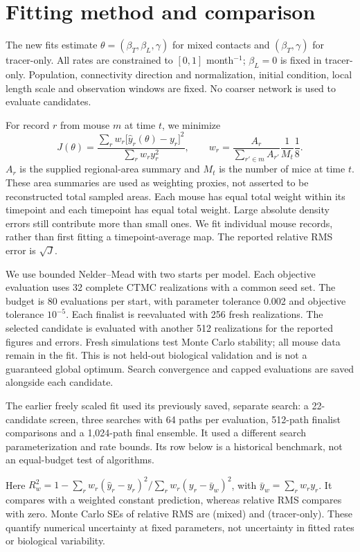 \documentclass[10pt]{article}
\begin{document}
\newpage
\section{Fitting method and comparison}
The new fits estimate $\theta=(\beta_T,\beta_L,\gamma)$ for mixed contacts and $(\beta_T,\gamma)$ for tracer-only. All rates are constrained to $[0,1]$ month$^{-1}$; $\beta_L=0$ is fixed in tracer-only. Population, connectivity direction and normalization, initial condition, local length scale and observation windows are fixed. No coarser network is used to evaluate candidates.

For record $r$ from mouse $m$ at time $t$, we minimize
\begin{equation}
 J(\theta)=\frac{\sum_r w_r\big[\widehat y_r(\theta)-y_r\big]^2}
 {\sum_r w_r y_r^2},\qquad
 w_r=\frac{A_r}{\sum_{r'\in m} A_{r'}}\frac{1}{M_t}\frac{1}{8}.\label{eq:loss}
\end{equation}
$A_r$ is the supplied regional-area summary and $M_t$ is the number of mice at time $t$. These area summaries are used as weighting proxies, not asserted to be reconstructed total sampled areas. Each mouse has equal total weight within its timepoint and each timepoint has equal total weight. Large absolute density errors still contribute more than small ones. We fit individual mouse records, rather than first fitting a timepoint-average map. The reported relative RMS error is $\sqrt J$.

We use bounded Nelder--Mead with two starts per model. Each objective evaluation uses 32 complete CTMC realizations with a common seed set. The budget is 80 evaluations per start, with parameter tolerance 0.002 and objective tolerance $10^{-5}$. Each finalist is reevaluated with 256 fresh realizations. The selected candidate is evaluated with another 512 realizations for the reported figures and errors. Fresh simulations test Monte Carlo stability; all mouse data remain in the fit. This is not held-out biological validation and is not a guaranteed global optimum. Search convergence and capped evaluations are saved alongside each candidate.

The earlier freely scaled fit used its previously saved, separate search: a 22-candidate screen, three searches with 64 paths per evaluation, 512-path finalist comparisons and a 1,024-path final ensemble. It used a different search parameterization and rate bounds. Its row below is a historical benchmark, not an equal-budget test of algorithms.

\begin{center}\small

\end{center}
Here $R_w^2=1-\sum_r w_r(\widehat y_r-y_r)^2/\sum_r w_r(y_r-\bar y_w)^2$, with $\bar y_w=\sum_r w_r y_r$. It compares with a weighted constant prediction, whereas relative RMS compares with zero. Monte Carlo SEs of relative RMS are \MixedErrorSE{} (mixed) and \TracerErrorSE{} (tracer-only). These quantify numerical uncertainty at fixed parameters, not uncertainty in fitted rates or biological variability.
\end{document}
